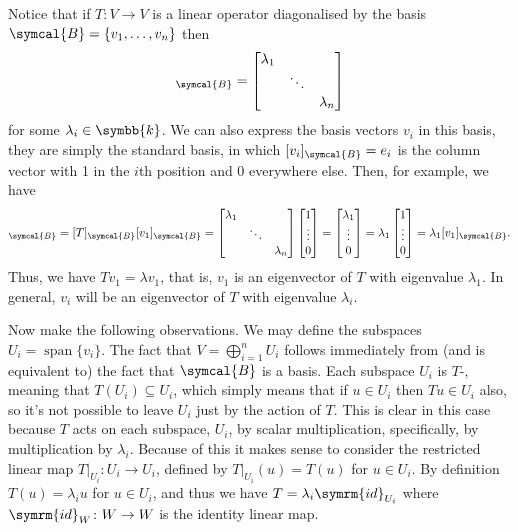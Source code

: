 \documentclass[fleqn]{NotesClass}
\renewcommand{\field}{\symbb{k}}
\DeclareMathOperator{\Span}{span}
\newcommand{\id}{\symrm{id}}
\begin{document}
    Notice that if \(T \colon V \to V\) is a linear operator diagonalised by the basis \(\symcal{B} = \{v_1, \dotsc, v_n\}\) then
    \begin{equation}
        [T]_{\symcal{B}} = 
        \begin{bmatrix}
            \lambda_1 & & \\
            & \ddots & \\
            & & \lambda_n
        \end{bmatrix}
    \end{equation} 
    for some \(\lambda_i \in \field\).
    We can also express the basis vectors \(v_i\) in this basis, they are simply the standard basis, in which \([v_i]_{\symcal{B}} = e_i\) is the column vector with 1 in the \(i\)th position and 0 everywhere else.
    Then, for example, we have
    \begin{equation}
        [Tv_1]_{\symcal{B}} = [T]_{\symcal{B}}[v_1]_{\symcal{B}} = 
        \begin{bmatrix}
            \lambda_1 & & \\
            & \ddots & \\
            & & \lambda_n
        \end{bmatrix}
        \begin{bmatrix}
            1\\ \vdots\\ 0
        \end{bmatrix}
        =
        \begin{bmatrix}
            \lambda_1\\ \vdots\\ 0
        \end{bmatrix}
        = \lambda_1
        \begin{bmatrix}
            1\\ \vdots\\ 0
        \end{bmatrix}
        = \lambda_1 [v_1]_{\symcal{B}}.
    \end{equation}
    Thus, we have \(Tv_1 = \lambda v_1\), that is, \(v_1\) is an eigenvector of \(T\) with eigenvalue \(\lambda_1\).
    In general, \(v_i\) will be an eigenvector of \(T\) with eigenvalue \(\lambda_i\).
    
    Now make the following observations.
    We may define the subspaces \(U_i = \Span\{v_i\}\).
    The fact that \(V = \bigoplus_{i=1}^n U_i\) follows immediately from (and is equivalent to) the fact that \(\symcal{B}\) is a basis.
    Each subspace \(U_i\) is \(T\)-, meaning that \(T(U_i) \subseteq U_i\), which simply means that if \(u \in U_i\) then \(Tu \in U_i\) also, so it's not possible to leave \(U_i\) just by the action of \(T\).
    This is clear in this case because \(T\) acts on each subspace, \(U_i\), by scalar multiplication, specifically, by multiplication by \(\lambda_i\).
    Because of this it makes sense to consider the restricted linear map \(T|_{U_i} \colon U_i \to U_i\), defined by \(T|_{U_i}(u) = T(u)\) for \(u \in U_i\).
    By definition \(T(u) = \lambda_i u\) for \(u \in U_i\), and thus we have \(T = \lambda_i \id_{U_i}\) where \(\id_W \colon W \to W\) is the identity linear map.
    
\end{document}
